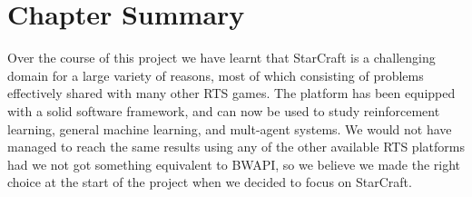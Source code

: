 \section{Chapter Summary}

Over the course of this project we have learnt that StarCraft is a challenging
domain for a large variety of reasons, most of which consisting of problems
effectively shared with many other RTS games. The platform has been equipped
with a solid software framework, and can now be used to study reinforcement
learning, general machine learning, and mult-agent systems. We would not have
managed to reach the same results using any of the other available RTS platforms
had we not got something equivalent to BWAPI, so we believe we made the right
choice at the start of the project when we decided to focus on StarCraft.
 